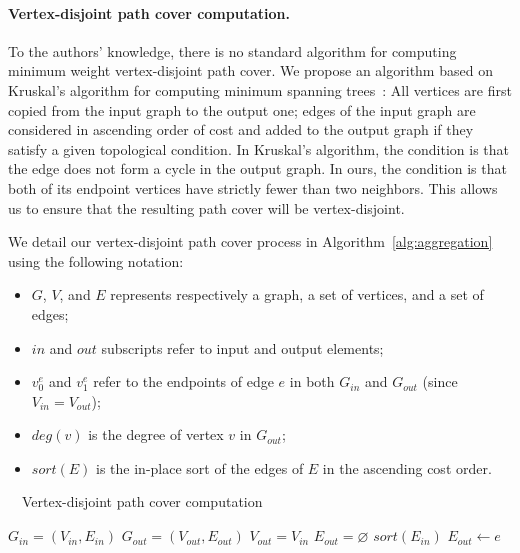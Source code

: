 \paragraph*{Vertex-disjoint path cover computation.}

To the authors' knowledge, there is no standard algorithm for computing minimum weight vertex-disjoint path cover. 
We propose an algorithm based on Kruskal's algorithm for computing minimum spanning trees~\cite{kruskal1956shortest}:
All vertices are first copied from the input graph to the output one;
edges of the input graph are considered in ascending order of cost and added to the output graph if they satisfy a given topological condition.
In Kruskal's algorithm, the condition is that the edge does not form a cycle in the output graph.
In ours, the condition is that both of its endpoint vertices have strictly fewer than two neighbors.
This allows us to ensure that the resulting path cover will be vertex-disjoint. 

We detail our vertex-disjoint path cover process in Algorithm~\ref{alg:aggregation} using the following notation:
\begin{itemize}
  \item $G$, $V$, and $E$ represents respectively a graph, a set of vertices, and a set of edges;
  \item $in$ and $out$ subscripts refer to input and output elements;
  \item $v^e_0$ and $v^e_1$ refer to the endpoints of edge $e$ in both $G_{in}$ and $G_{out}$ (since $V_{in} = V_{out}$);
  \item $deg(v)$ is the degree of vertex $v$ in $G_{out}$;
  \item $sort(E)$ is the in-place sort of the edges of $E$ in the ascending cost order.
\end{itemize}

\begin{algorithm}
    \caption[Fluid sculpting: Aggregation]{~~Vertex-disjoint path cover computation} 
\label{alg:aggregation}
\begin{algorithmic}

\State $ G_{in}  = ( V_{in},  E_{in}  ) $ 
\State $ G_{out} = ( V_{out}, E_{out} ) $ 
\State $ V_{out} = V_{in}$ 
\State $ E_{out} = \varnothing $
\State $ sort(E_{in}) $
  	\State $E_{out} \gets e$
  \EndIf
\EndFor
\end{algorithmic}
\end{algorithm} 

